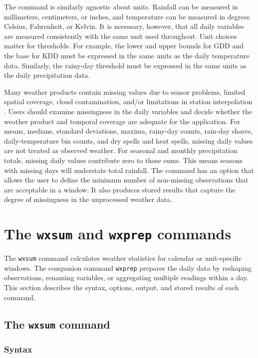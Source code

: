 The command is similarly agnostic about units. Rainfall can be measured in millimeters, centimeters, or inches, and temperature can be measured in degrees Celsius, Fahrenheit, or Kelvin. It is necessary, however, that all daily variables are measured consistently with the same unit used throughout. Unit choices matter for thresholds. For example, the lower and upper bounds for GDD and the base for KDD must be expressed in the same units as the daily temperature data. Similarly, the rainy-day threshold must be expressed in the same units as the daily precipitation data.

Many weather products contain missing values due to sensor problems, limited spatial coverage, cloud contamination, and/or limitations in station interpolation \citep{Dinku2020}. Users should examine missingness in the daily variables and decide whether the weather product and temporal coverage are adequate for the application. For means, medians, standard deviations, maxima, rainy-day counts, rain-day shares, daily-temperature bin counts, and dry spells and heat spells, missing daily values are not treated as observed weather. For seasonal and monthly precipitation totals, missing daily values contribute zero to those sums. This means seasons with missing days will understate total rainfall. The command has an option that allows the user to define the minimum number of non-missing observations that are acceptable in a window. It also produces stored results that capture the degree of missingness in the unprocessed weather data.

\section{The \texttt{wxsum} and \texttt{wxprep} commands}
\label{sec:commands}

The \texttt{wxsum} command calculates weather statistics for calendar or unit-specific windows. The companion command \texttt{wxprep} prepares the daily data by reshaping observations, renaming variables, or aggregating multiple readings within a day. This section describes the syntax, options, output, and stored results of each command.

\subsection{The \texttt{wxsum} command}
\label{sec:wxsum}

\subsubsection{Syntax}

